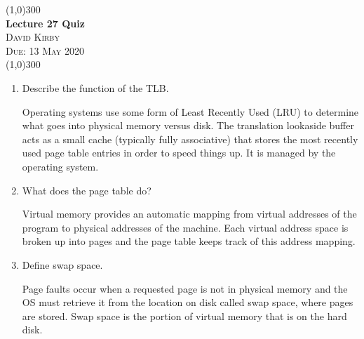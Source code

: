 \documentclass[12pt]{article}
\begin{document}
 	\begin{center}
     \line(1,0){300}\\[0.25cm]
 	\Large{\bfseries Lecture 27 Quiz}\\
 	\textsc{\large David Kirby}\\
 	\textsc{\large Due: 13 May 2020}\\
 	\line(1,0){300}\\[0.75cm]
 	\end{center}

\begin{enumerate}
\bfseries \item Describe the function of the TLB.\par
\mdseries Operating systems use some form of Least Recently Used (LRU) to determine what goes into physical memory versus disk. The translation lookaside buffer acts as a small cache (typically fully associative) that stores the most recently used page table entries in order to speed things up. It is managed by the operating system.
\bfseries \item What does the page table do?\par
\mdseries Virtual memory provides an automatic mapping from virtual addresses of the program to physical addresses of the machine. Each virtual address space is broken up into pages and the page table keeps track of this address mapping.
\bfseries \item Define swap space.\par
\mdseries Page faults occur when a requested page is not in physical memory and the OS must retrieve it from the location on disk called swap space, where pages are stored. Swap space is the portion of virtual memory that is on the hard disk.
\end{enumerate}
\end{document}
